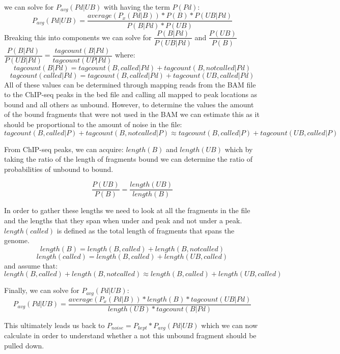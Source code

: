 we can solve for $P_{avg}(Pd|UB)$ with having the term $P(Pd)$:
$$P_{avg}(Pd|UB) = \dfrac{average(P_x(Pd|B))*P(B)*P(UB|Pd)}{P(B|Pd)*P(UB)}$$
Breaking this into components we can solve for $\dfrac{P(B|Pd)}{P(UB|Pd)}$ and $\dfrac{P(UB)}{P(B)}$
$\dfrac{P(B|Pd)}{P(UB|Pd)} = \dfrac{tagcount(B|Pd)}{tagcount(UP|Pd)}$
where: 
$$tagcount(B|Pd) = tagcount(B, called|Pd) + tagcount(B, not called|Pd)$$
$$tagcount(called|Pd) = tagcount(B, called|Pd) + tagcount(UB, called|Pd)$$
All of these values can be determined through mapping reads from the BAM file to the ChIP-seq peaks in the bed file and calling all mapped to peak locations as bound and all others as unbound. However, to determine the values the amount of the bound fragments that were not used in the BAM we can estimate this as it should be proportional to the amount of noise in the file:
$$tagcount(B, called|P) + tagcount(B, not called|P) \approx tagcount(B, called|P) + tagcount(UB, called|P)$$

From ChIP-seq peaks, we can acquire: $length(B)$ and $length(UB)$ which by taking the ratio of the length of fragments bound we can determine the ratio of probabilities of unbound to bound.

$$\dfrac{P(UB)}{P(B)} = \dfrac{length(UB)}{length(B)}$$

In order to gather these lengths we need to look at all the fragments in the file and the lengths that they span when under and peak and not under a peak. $length(called)$ is defined as the total length of fragments that spans the genome. 
$$length(B) = length(B, called) + length(B, not called)$$
$$length(called) = length(B, called) + length(UB, called)$$
and assume that:
$$length(B, called) + length(B, not called) \approx length(B, called) + length(UB, called)$$

Finally, we can solve for $P_{avg}(Pd|UB)$:
$$P_{avg}(Pd|UB) = \dfrac{average(P_x(Pd|B))*length(B)*tagcount(UB|Pd)}{length(UB)*tagcount(B|Pd)}$$

This ultimately leads us back to $P_{noise} = P_{kept}*P_{avg}(Pd|UB)$ which we can now calculate in order to understand whether a not this unbound fragment should be pulled down.
